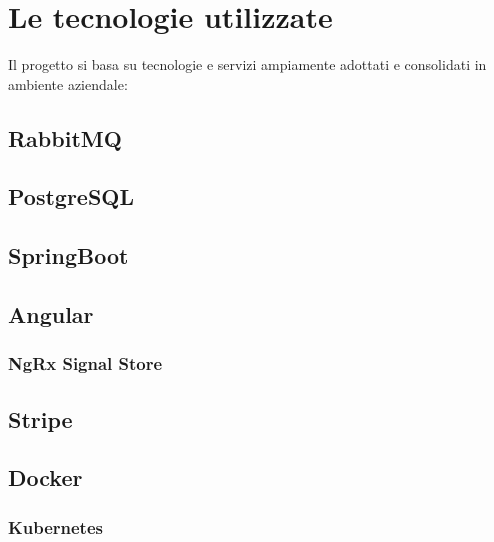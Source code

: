 \chapter{Le tecnologie utilizzate}
Il progetto si basa su tecnologie e servizi ampiamente adottati e consolidati in ambiente aziendale:

\section{RabbitMQ}

\section{PostgreSQL}

\section{SpringBoot}

\section{Angular}

\subsection {NgRx Signal Store}

\section{Stripe}

\section{Docker}

\subsection{Kubernetes}
